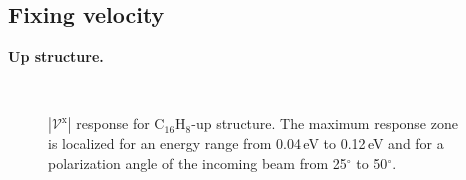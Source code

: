 \documentclass[prb,11pt,tightenlines,twocolumn,aps]{revtex4-1}
\begin{document}
\blindtext
\blindtext


\subsection{Fixing velocity} %
\label{sec:res-fixvel}


\textbf{Up structure.}

\begin{figure}[t]
    \centering
    \\
    \caption{$|\mathcal{V}^{\mathrm{x}}|$ response for C$_{16}$H$_{8}$-up
    structure. The maximum response zone is localized for an energy range from
    0.04\,eV to 0.12\,eV and for a polarization angle of the
    incoming beam from 25$^{\circ}$ to 50$^{\circ}$.}
    \label{fig:up-3d-1}
\end{figure}
\end{document}
